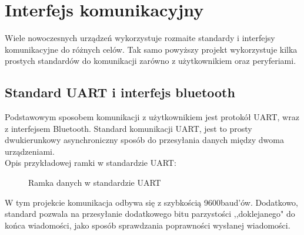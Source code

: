 \section{Interfejs komunikacyjny}
    \tab Wiele nowoczesnych urządzeń wykorzystuje rozmaite standardy i interfejsy komunikacyjne do różnych celów.
    Tak samo powyższy projekt wykorzystuje kilka prostych standardów do komunikacji zarówno z użytkownikiem oraz peryferiami.

    \subsection{Standard UART i interfejs bluetooth}
        \tab Podstawowym sposobem komunikacji z użytkownikiem jest protokół UART, wraz z interfejsem Bluetooth.
        Standard komunikacji UART, jest to prosty dwukierunkowy asynchroniczny sposób do przesyłania danych między dwoma urządzeniami.\\
        Opis przykładowej ramki w standardzie UART:
            
        \begin{figure}[!ht]
            \centering
            \caption{Ramka danych w standardzie UART}
        \end{figure}
% 
        \noindent
        W tym projekcie komunikacja odbywa się z szybkością 9600baud'ów.
        Dodatkowo, standard pozwala na przesyłanie dodatkowego bitu parzystości ,,doklejanego" do końca wiadomości, jako sposób sprawdzania poprawności wysłanej wiadomości.

